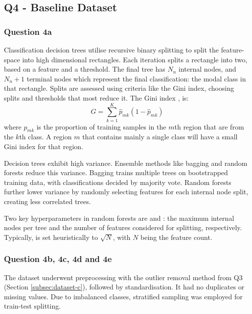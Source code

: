 
\subsection{Q4 - Baseline Dataset}\label{subsec:q4}
\subsubsection{Question 4a}\label{subsubsec:q4a}
    Classification decision trees utilise recursive binary splitting to split the feature-space into high dimensional
    rectangles.
    Each iteration splits a rectangle into two, based on a feature and a threshold.
    The final tree has $N_{n}$ internal nodes, and $N_{n} + 1$ terminal nodes which represent the final classification:
    the modal class in that rectangle.
    Splits are assessed using criteria like the Gini index, choosing splits and thresholds that most reduce it.
    The Gini index \cite{ISL}, is:
    \begin{equation}
        G = \sum_{k=1}^{K} \hat{p}_{mk}(1 - \hat{p}_{mk})
        \label{eq:gini-index}
    \end{equation}
    where $\hat{p}_{mk}$ is the proportion of training samples in the $m$th region that are from the $k$th class.
    A region $m$ that contains mainly a single class will have a small Gini index for that region.

    Decision trees exhibit high variance.
    Ensemble methods like bagging and random forests reduce this variance.
    Bagging trains multiple trees on bootstrapped training data, with classifications decided by majority vote.
    Random forests further lower variance by randomly selecting features for each internal node split, creating less
    correlated trees.

    Two key hyperparameters in random forests are  and : the maximum
    internal nodes per tree and the number of features considered for splitting, respectively.
    Typically,  is set heuristically to $\sqrt{N}$, with $N$ being the feature count.

\subsubsection{Question 4b, 4c, 4d and 4e}\label{subsubsec:q4bcde}
    The dataset underwent preprocessing with the outlier removal method from Q3 (Section \ref{subsec:dataset-c}), followed by
    standardisation.
    It had no duplicates or missing values.
    Due to imbalanced classes, stratified sampling was employed for train-test splitting.

